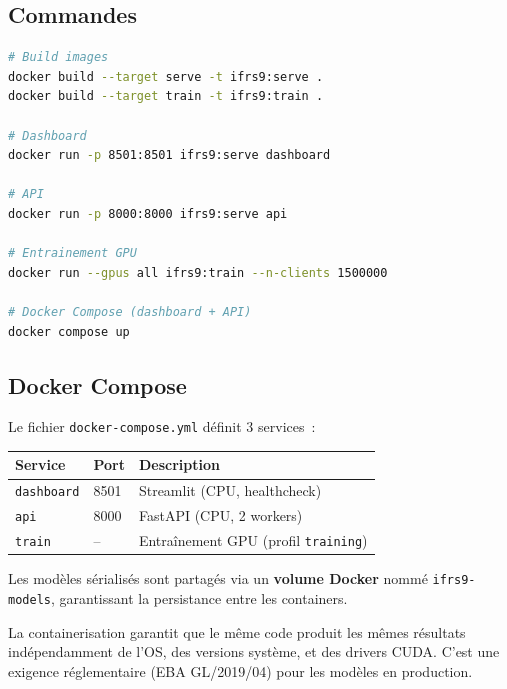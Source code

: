 \documentclass[12pt,a4paper]{article}
\begin{document}
\subsection{Commandes}

\begin{lstlisting}[language=bash]
# Build images
docker build --target serve -t ifrs9:serve .
docker build --target train -t ifrs9:train .

# Dashboard
docker run -p 8501:8501 ifrs9:serve dashboard

# API
docker run -p 8000:8000 ifrs9:serve api

# Entrainement GPU
docker run --gpus all ifrs9:train --n-clients 1500000

# Docker Compose (dashboard + API)
docker compose up
\end{lstlisting}

\subsection{Docker Compose}

Le fichier \texttt{docker-compose.yml} d\'efinit 3 services~:

\begin{center}
\begin{tabular}{llp{5cm}}
\toprule
\textbf{Service} & \textbf{Port} & \textbf{Description} \\
\midrule
\texttt{dashboard} & 8501 & Streamlit (CPU, healthcheck) \\
\texttt{api} & 8000 & FastAPI (CPU, 2 workers) \\
\texttt{train} & -- & Entra\^inement GPU (profil \texttt{training}) \\
\bottomrule
\end{tabular}
\end{center}

Les mod\`eles s\'erialis\'es sont partag\'es via un \textbf{volume Docker} nomm\'e \texttt{ifrs9-models}, garantissant la persistance entre les containers.

\begin{warningbox}
La containerisation garantit que le m\^eme code produit les m\^emes r\'esultats ind\'ependamment de l'OS, des versions syst\`eme, et des drivers CUDA. C'est une exigence r\'eglementaire (EBA GL/2019/04) pour les mod\`eles en production.
\end{warningbox}


\end{document}
